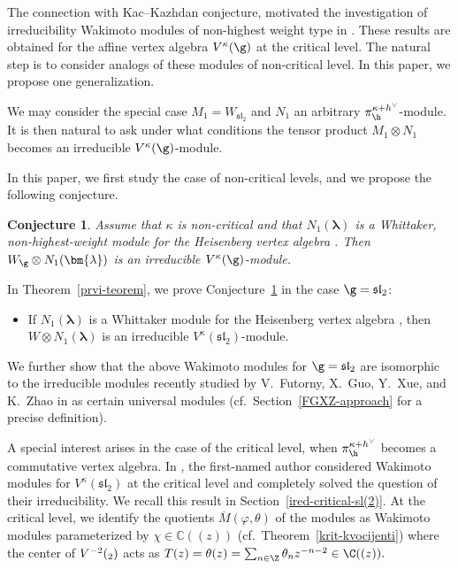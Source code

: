 \documentclass[pdftex]{sigma}
\numberwithin{equation}{section}
\newtheorem{Conjecture}[Theorem]{Conjecture}
\theoremstyle{definition}
\newcommand{\1}{\textbf{1}}
\begin{document}
The connection with Kac--Kazhdan conjecture, motivated the investigation of irreducibility Wakimoto modules of non-highest weight type in \cite{A-07, A-14, AJM}. These results are obtained for the affine vertex algebra $V^{\kappa}(\g)$ at the critical level. The natural step is to consider analogs of these modules of non-critical level. In this paper, we propose one generalization.

We may consider the special case $M_1 = W_{\mathfrak{sl}_2}$ and $N_1$ an arbitrary $\pi_{\h}^{\kappa + h^{\vee}}$-module.
It is then natural to ask under what conditions the tensor product $M_1 \otimes N_1$ becomes an irreducible $V^{\kappa}(\g)$-module.

In this paper, we first study the case of non-critical levels, and we propose the following conjecture.

\begin{Conjecture} \label{slutnja}
Assume that $\kappa$ is non-critical and that
$N_1(\bm{\lambda})$ is a Whittaker, non-highest-weight module for the Heisenberg vertex algebra .
Then $W_{\g} \otimes N_1(\bm{\lambda})$ is an irreducible $V^{\kappa}(\g)$-module.
\end{Conjecture}

In Theorem~\ref{prvi-teorem}, we prove Conjecture~\ref{slutnja} in the case $\g = \mathfrak{sl}_2$:
\begin{itemize}\itemsep=0pt
 \item If $N_1(\bm{\lambda})$ is a Whittaker module for the Heisenberg vertex algebra ,
 then $W \otimes N_1(\bm{\lambda})$ is an irreducible $V^{\kappa}(\mathfrak{sl}_2)$-module.
\end{itemize}

We further show that the above Wakimoto modules for $\g = \mathfrak{sl}_2$ are isomorphic to the irreducible modules
 recently studied by V.~Futorny, X.~Guo, Y.~Xue, and K.~Zhao in \cite{FGXZ} as certain universal modules
(cf.~Section~\ref{FGXZ-approach} for a precise definition).

A special interest arises in the case of the critical level, when $\pi_{\h}^{\kappa + h^{\vee}}$ becomes a commutative vertex algebra.
In \cite{A-07,A-14}, the first-named author considered Wakimoto modules for $V^{\kappa}(\mathfrak{sl}_2)$ at the critical level
and completely solved the question of their irreducibility.
We recall this result in Section~\ref{ired-critical-sl(2)}.
At the critical level, we identify the quotients $\overline{M}(\varphi, \theta)$ of the modules 
as Wakimoto modules parameterized by $\chi \in \mathbb{C}((z))$ (cf.~Theorem~\ref{krit-kvocijenti})
where
the center of $V^{-2} (\sl_2)$ acts as $ T(z) = \theta(z) = \sum _{n \in {\Z}} \theta_n z^{-n-2} \in \C((z)).$
\end{document}
